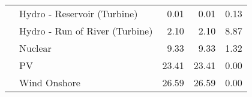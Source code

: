 \begin{table}
\begin{tabular}{llrrr}
   & Hydro - Reservoir (Turbine) &               0.01 &              0.01 &            0.13 \\
   & Hydro - Run of River (Turbine) &               2.10 &              2.10 &            8.87 \\
   & Nuclear &               9.33 &              9.33 &            1.32 \\
   & PV &              23.41 &             23.41 &            0.00 \\
   & Wind Onshore &              26.59 &             26.59 &            0.00 \\
\bottomrule
\end{tabular}
\end{table}
